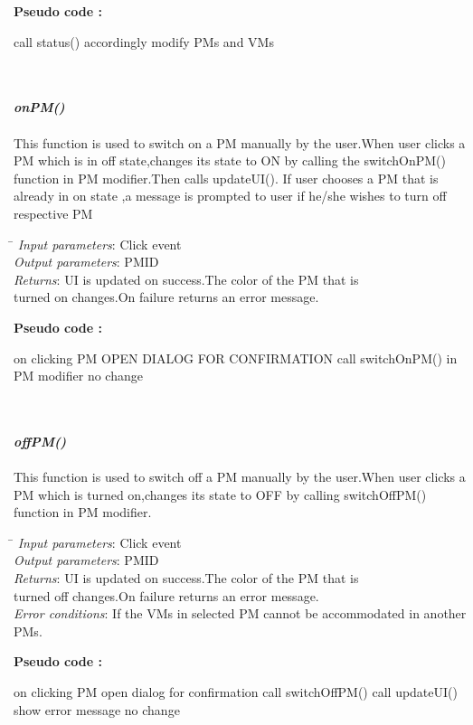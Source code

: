 ﻿\documentclass[a4paper,11pt]{article}
\begin{document}
\textbf{Pseudo code :}
\begin{algorithmic}[1]
 \STATE call status()
 \STATE accordingly modify PMs and VMs
\end{algorithmic}
\mbox{}\\\\
\emph{\bf onPM()}\\\\
This function is used to switch on a PM manually by the user.When user clicks a PM  which is in off state,changes its state to ON by calling the switchOnPM() function in PM modifier.Then calls updateUI().
If user chooses a PM that is already in on state ,a message is prompted to user if he/she wishes to turn off respective PM
\\\begin{tabbing}
  \hspace*{4cm}\= \kill
\emph{Input parameters}\>: Click event\\
\emph{Output parameters}\>: PM\textunderscore ID\\
\emph{Returns}\>: UI is updated on success.The color of the PM that is \\ \> turned on changes.On failure returns an error message.\\ 
\end{tabbing}
\textbf{Pseudo code :}
\begin{algorithmic}[1]
 \STATE on clicking PM 
 \STATE OPEN DIALOG FOR CONFIRMATION
 \STATE call switchOnPM() in PM modifier
 \ELSE 
 \STATE no change
 \ENDIF
 \ENDIF
\end{algorithmic}
\mbox{}\\\\
\emph{\bf offPM()}
\\\\
This function is used to switch off a PM manually by the user.When user clicks a PM which is turned on,changes its state to OFF by calling switchOffPM() function in PM modifier.
\\\begin{tabbing}
  \hspace*{4cm}\= \kill
  \emph{Input parameters}\>: Click event\\
  \emph{Output parameters}\>: PM\textunderscore ID\\
  \emph{Returns}\>: UI is updated on success.The color of the PM that is \\ \> turned off changes.On failure returns an error message.\\
  \emph{Error conditions}\>: If the VMs in selected PM cannot be accommodated in another PMs.
  \end{tabbing}
  \textbf{Pseudo code :}
  \begin{algorithmic}[1]
   \STATE on clicking PM 
   \STATE open dialog for confirmation
   \STATE call switchOffPM()
   \STATE call updateUI()
   \ELSE 
   \STATE show error message
   \ENDIF
   \ELSE
   \STATE no change
   \ENDIF
   \ENDIF
  \end{algorithmic}
\pagebreak
\end{document}
